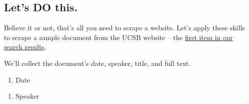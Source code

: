 \documentclass[]{book}
\newenvironment{Shaded}{\begin{snugshade}}{\end{snugshade}}
\newcommand{\KeywordTok}[1]{\textcolor[rgb]{0.13,0.29,0.53}{\textbf{#1}}}
\newcommand{\StringTok}[1]{\textcolor[rgb]{0.31,0.60,0.02}{#1}}
\newcommand{\CommentTok}[1]{\textcolor[rgb]{0.56,0.35,0.01}{\textit{#1}}}
\newcommand{\OperatorTok}[1]{\textcolor[rgb]{0.81,0.36,0.00}{\textbf{#1}}}
\newcommand{\NormalTok}[1]{#1}
\providecommand{\tightlist}{%
  \setlength{\itemsep}{0pt}\setlength{\parskip}{0pt}}
\begin{document}
\subsection{Let's DO this.}\label{lets-do-this.}

Believe it or not, that's all you need to scrape a website. Let's apply
these skills to scrape a sample document from the UCSB website -- the
\href{\%22http://www.presidency.ucsb.edu/documents/letter-t-keith-glennan-administrator-national-aeronautics-and-space-administration\%22}{first
item in our search results}.

We'll collect the document's date, speaker, title, and full text.

\begin{enumerate}
\def\labelenumi{\arabic{enumi}.}
\tightlist
\item
  Date
\end{enumerate}

\begin{Shaded}
\end{Shaded}

\begin{enumerate}
\def\labelenumi{\arabic{enumi}.}
\setcounter{enumi}{1}
\tightlist
\item
  Speaker
\end{enumerate}

\begin{Shaded}
\end{Shaded}
\end{document}
